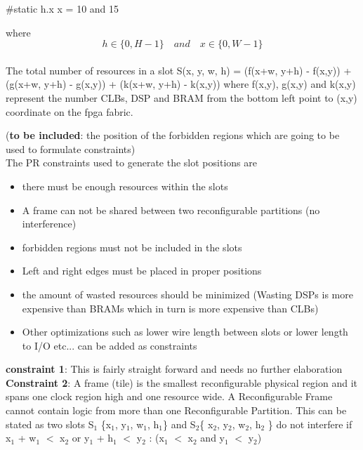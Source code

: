 \documentclass[11pt]{article}
\theoremstyle{definition}
\begin{document}
\hspace{15mm} \#static \hspace{48mm} h.x    \hspace{10mm} x = 10 and 15		  
					  
\hspace{15mm} where \[h\in \{0, H-1 \}  \quad and \quad x\in \{0, W-1 \} \] \\

The total number of resources in a slot S(x, y, w, h) = (f(x+w, y+h) - f(x,y)) + (g(x+w, y+h) - g(x,y)) + (k(x+w, y+h) - k(x,y)) where f(x,y), g(x,y) and k(x,y) represent the number CLBs, DSP and BRAM from the bottom left point to (x,y) coordinate on the fpga fabric.

\hspace{15mm} (\textbf{to be included}: the position of the forbidden regions which are going to be used to formulate constraints) \\

The PR constraints used to generate the slot positions are
\begin{itemize}
\item there must be enough resources within the slots
\item A frame can not be shared between two reconfigurable partitions (no interference)
\item forbidden regions must not be included in the slots 
\item Left and right edges must be placed in proper positions
\item the amount of wasted resources should be minimized (Wasting DSPs is more expensive than BRAMs which in turn is more expensive than CLBs)
\item Other optimizations such as lower wire length between slots or lower length to I/O etc... can be added as constraints
\end{itemize}

\textbf{constraint 1}: This is fairly straight forward and needs no further elaboration \\
\textbf{Constraint 2}: A frame (tile) is the smallest reconfigurable physical region and it spans one clock region high and one resource wide. A Reconfigurable Frame cannot contain logic from more than one Reconfigurable Partition. This can be stated as two slots S$_1$ \{x$_1$, y$_1$, w$_1$, h$_1$\} and S$_2$\{ x$_2$, y$_2$, w$_2$, h$_2$ \} do not interfere if \\

\hspace{15mm}  x$_1$ + w$_1$ $<$ x$_2$ or y$_1$ + h$_1$ $<$ y$_2$ : (x$_1$ $<$ x$_2$ and y$_1$ $<$ y$_2$) \\
\end{document}
